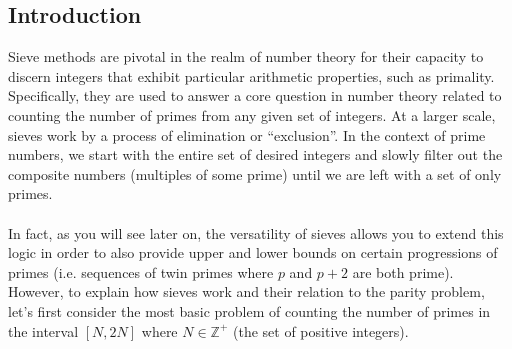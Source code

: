 \documentclass[10pt]{extarticle}
\begin{document}
\subsection{Introduction}
Sieve methods are pivotal in the realm of number theory for their capacity to discern integers that exhibit particular arithmetic properties, such as primality. 
Specifically, they are used to answer a core question in number theory related to counting the number of primes from any given set of integers. 
At a larger scale, sieves work by a process of elimination or ``exclusion''. In the context of prime numbers, we start with the entire set of desired integers and slowly filter out the composite numbers (multiples of some prime) until we are left with a set of only primes. \\
\\
In fact, as you will see later on, the versatility of sieves allows you to extend this logic in order to also provide upper and lower bounds on certain progressions of primes (i.e. sequences of twin primes where $p$ and $p+2$ are both prime).
However, to explain how sieves work and their relation to the parity problem, let's first consider the most basic problem of counting the number of primes in the interval $[N, 2N]$ where $N \in \mathbb{Z}^+$ (the set of positive integers). 
\end{document}
